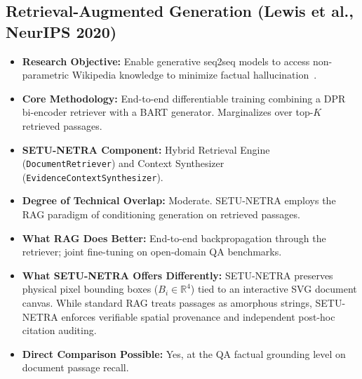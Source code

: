 \documentclass[11pt,a4paper]{article}
\begin{document}
\subsection{Retrieval-Augmented Generation (Lewis et al., NeurIPS 2020)}
\begin{itemize}[leftmargin=*]
    \item \textbf{Research Objective:} Enable generative seq2seq models to access non-parametric Wikipedia knowledge to minimize factual hallucination~\cite{Lewis2020RAG}.
    \item \textbf{Core Methodology:} End-to-end differentiable training combining a DPR bi-encoder retriever with a BART generator. Marginalizes over top-$K$ retrieved passages.
    \item \textbf{SETU-NETRA Component:} Hybrid Retrieval Engine (\texttt{DocumentRetriever}) and Context Synthesizer (\texttt{EvidenceContextSynthesizer}).
    \item \textbf{Degree of Technical Overlap:} Moderate. SETU-NETRA employs the RAG paradigm of conditioning generation on retrieved passages.
    \item \textbf{What RAG Does Better:} End-to-end backpropagation through the retriever; joint fine-tuning on open-domain QA benchmarks.
    \item \textbf{What SETU-NETRA Offers Differently:} SETU-NETRA preserves physical pixel bounding boxes ($B_i \in \mathbb{R}^4$) tied to an interactive SVG document canvas. While standard RAG treats passages as amorphous strings, SETU-NETRA enforces verifiable spatial provenance and independent post-hoc citation auditing.
    \item \textbf{Direct Comparison Possible:} Yes, at the QA factual grounding level on document passage recall.
\end{itemize}

\end{document}

